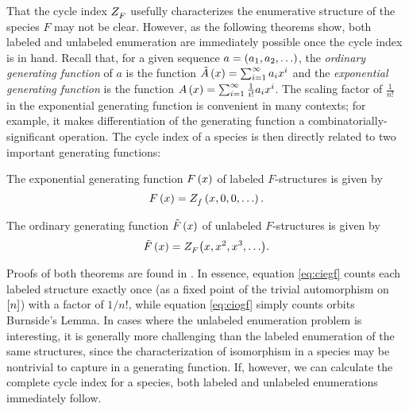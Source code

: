 \documentclass[distribution,draft]{brandiss} %
\numberwithin{section}{chapter}
\numberwithin{figure}{chapter}
\begin{document}
That the cycle index $ Z_{F}^{} $ usefully characterizes the enumerative structure of the species $F$ may not be clear.
However, as the following theorems show, both labeled and unlabeled enumeration are immediately possible once the cycle index is in hand.
Recall that, for a given sequence $a = \left( {a_{1}, a_{2}, \dots} \right)$, the \emph{ordinary generating function} of $a$ is the function $\tilde{A} \left( {x} \right) = \sum_{i = 1}^{\infty} a_{i} x^{i}$ and the \emph{exponential generating function}  is the function $A \left( {x} \right) = \sum_{i = 1}^{\infty} \frac{1}{i!} a_{i} x^{i}$.
The scaling factor of $\frac{1}{n!}$ in the exponential generating function is convenient in many contexts; for example, it makes differentiation of the generating function a combinatorially-significant operation.
The cycle index of a species is then directly related to two important generating functions:
\begin{theorem}\label{thm:ciegf}
  The exponential generating function $F \left( {x} \right)$ of labeled $F$-structures is given by
  \begin{equation}\label{eq:ciegf}
    F \left( {x} \right) =  Z_{f}^{} \left( {x, 0, 0, \dots} \right) .
  \end{equation}
\end{theorem}
\begin{theorem}\label{thm:ciogf}
  The ordinary generating function $\tilde{F} \left( {x} \right)$ of unlabeled $F$-structures is given by
  \begin{equation}\label{eq:ciogf}
    \tilde{F} \pbrac{x} = \ci{F} \pbracs[big]{x, x^{2}, x^{3}, \dots}.
  \end{equation}
\end{theorem}
Proofs of both theorems are found in \cite[\S 1.2]{bll:species}.
In essence, equation \eqref{eq:ciegf} counts each labeled structure exactly once (as a fixed point of the trivial automorphism on $\left[ {n} \right]$) with a factor of $1/n!$, while equation \eqref{eq:ciogf} simply counts orbits  Burnside's Lemma.
In cases where the unlabeled enumeration problem is interesting, it is generally more challenging than the labeled enumeration of the same structures, since the characterization of isomorphism in a species may be nontrivial to capture in a generating function.
If, however, we can calculate the complete cycle index for a species, both labeled and unlabeled enumerations immediately follow.
\end{document}
